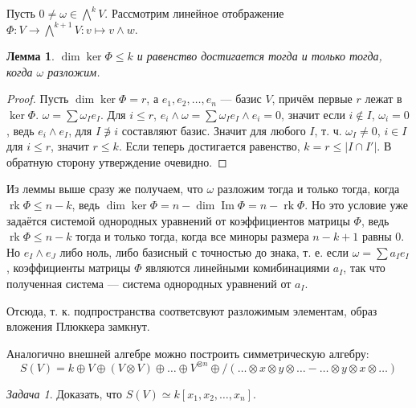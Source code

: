 \documentclass{article}
\newtheorem*{lemma}{Лемма}
\theoremstyle{definition}
\theoremstyle{remark}
\newtheorem{prb}{Задача}
\newenvironment{problem}
{\begin{prb}
\label{\theprb}}
{\end{prb}}
\DeclareMathOperator{\im}{Im}
\DeclareMathOperator{\rk}{rk}
\begin{document}
Пусть $0 \neq \omega \in \bigwedge^k V$. Рассмотрим линейное отображение $\Phi: V \rightarrow \bigwedge^{k + 1} V: v \mapsto v \wedge w$.

\begin{lemma}
$\dim \ker \Phi \le k$ и равенство достигается тогда и только тогда, когда $\omega$ разложим.
\end{lemma}
\begin{proof}
	Пусть $\dim \ker \Phi = r$, а $e_1, e_2, \ldots, e_n$ --- базис $V$, причём первые $r$ лежат в $\ker \Phi$. $\omega = \sum \omega_I e_I$. Для $i \le r$, $e_i \wedge \omega = \sum \omega_I e_I \wedge e_i = 0$, значит если $i \notin I$, $\omega_i = 0$, ведь $e_i \wedge e_I$, для $I \not \ni i$ составляют базис. Значит для любого $I$, т. ч. $\omega_I \neq 0$, $i \in I$ для $i  \le r$, значит $r \le k$. 
Если теперь достигается равенство, $k = r \le |I \cap I'|$. В обратную сторону утверждение очевидно.
\end{proof}

Из леммы выше сразу же получаем, что $\omega$ разложим тогда и только тогда, когда $\rk \Phi \le n - k$, ведь $\dim \ker \Phi = n - \dim \im \Phi  = n - \rk \Phi$. Но это условие уже задаётся системой однородных уравнений от коэффициентов матрицы $\Phi$, ведь $\rk \Phi \le n - k$ тогда и только тогда, когда все миноры размера $n - k + 1$ равны 0. Но $e_I \wedge e_J$ либо ноль, либо базисный с точностью до знака, т. е. если $\omega = \sum a_I e_I$, коэффициенты матрицы $\Phi$ являются линейными комибинациями $a_I$, так что полученная система --- система однородных уравнений от $a_I$.

Отсюда, т. к. подпространства соответсвуют разложимым элементам, образ вложения Плюккера замкнут.

Аналогично внешней алгебре можно построить симметрическую алгебру:
$$S(V) = k \oplus V \oplus (V \otimes V) \oplus \ldots \oplus V^{\otimes n} \oplus / (\ldots \otimes x \otimes y \otimes \ldots - \ldots \otimes y \otimes x \otimes \ldots)$$

\begin{problem}
Доказать, что $S(V) \simeq k[x_1, x_2, \ldots, x_n]$.
\end{problem}
\end{document}
